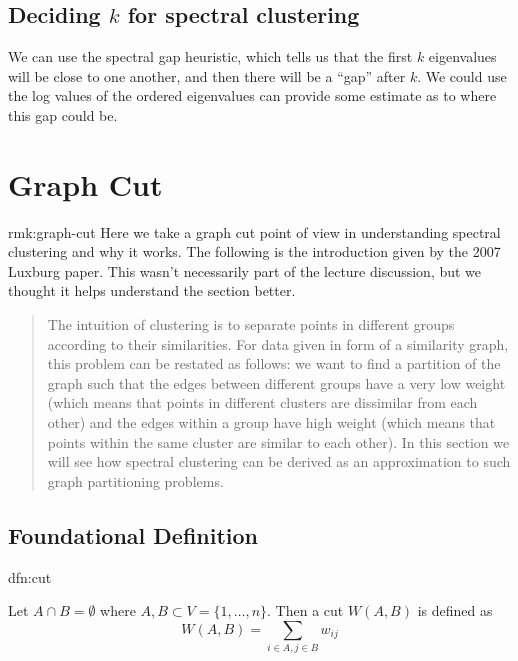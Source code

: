 \documentclass[12pt]{article}
\theoremstyle{plain}
\begin{document}
\subsection{Deciding $ k $ for spectral clustering}

We can use the spectral gap heuristic, which tells us that the first $ k $ eigenvalues will be close to one another, and then there will be a ``gap'' after $ k $.
We could use the log values of the ordered eigenvalues can provide some estimate as to where this gap could be.

\section{Graph Cut}

\begin{rmk}{rmk:graph-cut}
Here we take a graph cut point of view in understanding spectral clustering and why it works. The following is the introduction given by the 2007 Luxburg paper. This wasn't necessarily part of the lecture discussion, but we thought it helps understand the section better.
\end{rmk}

\begin{quote}
The intuition of clustering is to separate points in different groups according to their similarities. For data given in form of a similarity graph, this problem can be restated as follows: we want to find a partition of the graph such that the edges between different groups have a very low weight (which means that points in different clusters are dissimilar from each other) and the edges within a group have high weight (which means that points within the same cluster are similar to each other). In this section we will see how spectral clustering can be derived as an approximation to such graph partitioning problems.~\cite{luxburg-2007}
\end{quote}

\subsection{Foundational Definition}

\begin{dfn}[Cut]{dfn:cut}

Let $ A \cap B = \emptyset $ where $ A, B \subset V = \{ 1, \ldots, n \} $.
Then a cut $ W(A, B) $ is defined as
\[
W(A, B) = \sum_{i \in A, j \in B} w_{ij}
\]

\end{dfn}
\end{document}
